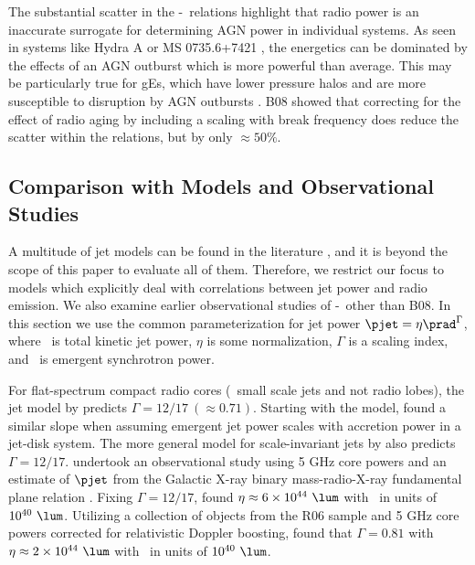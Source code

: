\documentclass{emulateapj}
\begin{document}
The substantial scatter in the \pjet-\prad\ relations highlight that
radio power is an inaccurate surrogate for determining AGN power in
individual systems. As seen in systems like Hydra A \citep{hydraa} or
MS 0735.6+7421 \citep{ms0735}, the energetics can be dominated by the
effects of an AGN outburst which is more powerful than average. This
may be particularly true for gEs, which have lower pressure halos and
are more susceptible to disruption by AGN outbursts
\citep{2006MNRAS.372.1161W, 2008ApJ...687L..53P}. B08 showed that
correcting for the effect of radio aging by including a scaling with
break frequency does reduce the scatter within the relations, but by
only $\approx 50\%$.

\subsection{Comparison with Models and Observational Studies}
\label{sec:models}

A multitude of jet models can be found in the literature
\citep[\ie][]{1973MNRAS.164..243L, 1974MNRAS.166..513S,
  1974MNRAS.169..395B, 1989ApJ...345L..21B, 2002ApJS..141..337C,
  2002ApJS..141..371C}, and it is beyond the scope of this paper to
evaluate all of them. Therefore, we restrict our focus to models which
explicitly deal with correlations between jet power and radio
emission. We also examine earlier observational studies of
\pjet-\prad\ other than B08. In this section we use the common
parameterization for jet power $\pjet = \eta \prad^{\Gamma}$, where
\pjet\ is total kinetic jet power, $\eta$ is some normalization,
$\Gamma$ is a scaling index, and \prad\ is emergent synchrotron power.

For flat-spectrum compact radio cores (\eg\ small scale jets and not
radio lobes), the jet model by \citet{1979ApJ...232...34B} predicts
$\Gamma = 12/17~(\approx 0.71)$. Starting with the
\citet{1979ApJ...232...34B} model, \citet{1995A&A...293..665F} found a
similar slope when assuming emergent jet power scales with accretion
power in a jet-disk system. The more general model for scale-invariant
jets by \citet{2003MNRAS.343L..59H} also predicts $\Gamma =
12/17$. \citet{2005ApJ...633..384H} undertook an observational study
using 5 GHz core powers and an estimate of $\pjet$ from the Galactic
X-ray binary mass-radio-X-ray fundamental plane relation
\citep{2003MNRAS.344...60G, 2003MNRAS.345.1057M}. Fixing $\Gamma =
12/17$, \citet{2005ApJ...633..384H} found $\eta \approx 6\times10^{44}
~\lum$ with \prad\ in units of $10^{40} ~\lum$.  Utilizing a
collection of objects from the R06 sample and 5 GHz core powers
corrected for relativistic Doppler boosting,
\citet{2007MNRAS.381..589M} found that $\Gamma = 0.81$ with $\eta
\approx 2\times10^{44} ~\lum$ with \prad\ in units of $10^{40} ~\lum$.
\end{document}
